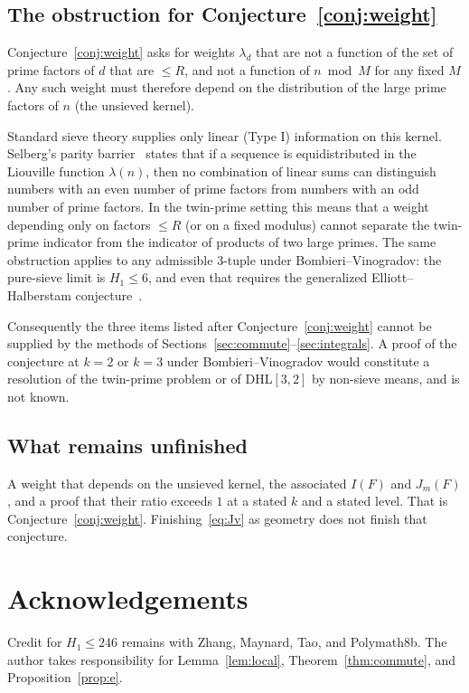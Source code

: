 \documentclass[11pt,a4paper]{article}
\theoremstyle{plain}
\theoremstyle{definition}
\theoremstyle{plain}
\numberwithin{equation}{section}
\begin{document}
\subsection{The obstruction for Conjecture~\ref{conj:weight}}
\label{sec:obstruction}

Conjecture~\ref{conj:weight} asks for weights \(\lambda_d\) that are not a function of the set of prime factors of \(d\) that are \(\le R\), and not a function of \(n\bmod M\) for any fixed \(M\). Any such weight must therefore depend on the distribution of the large prime factors of \(n\) (the unsieved kernel).

Standard sieve theory supplies only linear (Type I) information on this kernel. Selberg's parity barrier~\cite{Selberg1991} states that if a sequence is equidistributed in the Liouville function \(\lambda(n)\), then no combination of linear sums can distinguish numbers with an even number of prime factors from numbers with an odd number of prime factors. In the twin-prime setting this means that a weight depending only on factors \(\le R\) (or on a fixed modulus) cannot separate the twin-prime indicator from the indicator of products of two large primes. The same obstruction applies to any admissible 3-tuple under Bombieri--Vinogradov: the pure-sieve limit is \(H_1\le 6\), and even that requires the generalized Elliott--Halberstam conjecture~\cite{Polymath8b}.

Consequently the three items listed after Conjecture~\ref{conj:weight} cannot be supplied by the methods of Sections~\ref{sec:commute}--\ref{sec:integrals}. A proof of the conjecture at \(k=2\) or \(k=3\) under Bombieri--Vinogradov would constitute a resolution of the twin-prime problem or of DHL\([3,2]\) by non-sieve means, and is not known.

\subsection{What remains unfinished}
A weight that depends on the unsieved kernel, the associated \(I(F)\) and \(J_m(F)\), and a proof that their ratio exceeds \(1\) at a stated \(k\) and a stated level. That is Conjecture~\ref{conj:weight}. Finishing~\eqref{eq:Jv} as geometry does not finish that conjecture.

\section*{Acknowledgements}

Credit for \(H_1\le 246\) remains with Zhang, Maynard, Tao, and Polymath8b. The author takes responsibility for Lemma~\ref{lem:local}, Theorem~\ref{thm:commute}, and Proposition~\ref{prop:e}.
\end{document}
